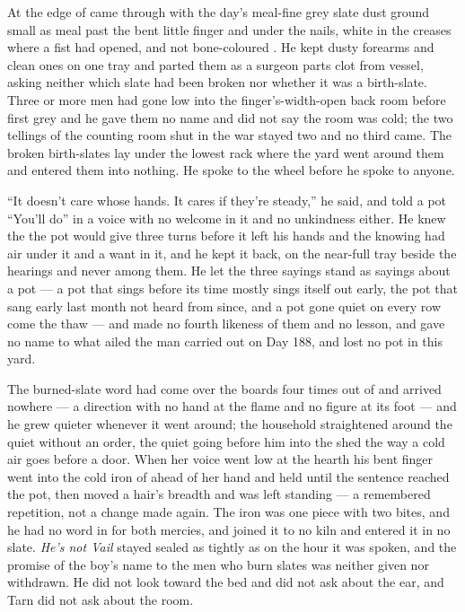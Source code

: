 \scenebreak

At the edge of   came through with the day's meal-fine grey slate dust ground small as meal past the bent little finger and under the nails, white in the creases where a fist had opened, and not bone-coloured . He kept dusty forearms and clean ones on one tray and parted them as a surgeon parts clot from vessel, asking neither which slate had been broken nor whether it was a birth-slate. Three or more men had gone low into the finger's-width-open back room before first grey and he gave them no name and did not say the room was cold; the two tellings of the counting room shut in the war stayed two and no third came. The broken birth-slates lay under the lowest rack where the yard went around them and entered them into nothing. He spoke to the wheel before he spoke to anyone.

“It doesn't care whose hands. It cares if they're steady,” he said, and told a pot “You'll do” in a voice with no welcome in it and no unkindness either. He knew the  the pot would give three turns before it left his hands and the knowing had air under it and a want in it, and he kept it back, on the near-full tray beside the hearings and never among them. He let the three sayings stand as sayings about a pot --- a pot that sings before its time mostly sings itself out early, the pot that sang early last month not heard from since, and a pot gone quiet on every row come the thaw --- and made no fourth likeness of them and no lesson, and gave no name to what ailed the man carried out on Day 188, and lost no pot in this yard.

The burned-slate word had come over the boards four times out of  and arrived nowhere --- a direction with no hand at the flame and no figure at its foot --- and he grew quieter whenever it went around; the household straightened around the quiet without an order, the quiet going before him into the shed the way a cold air goes before a door. When her voice went low at the hearth his bent finger went into the cold iron of  ahead of her hand and held until the sentence reached the pot, then moved a hair's breadth and was left standing --- a remembered repetition, not a change made again. The iron was one piece with two bites, and he had no word in  for both mercies, and joined it to no kiln and entered it in no slate. \emph{He's not Vail} stayed sealed as tightly as on the hour it was spoken, and the promise of the boy's name to the men who burn slates was neither given nor withdrawn. He did not look toward the bed and did not ask about the ear, and Tarn did not ask about the room.

